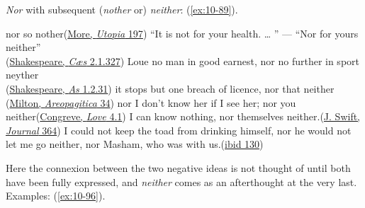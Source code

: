 \textit{Nor} with subsequent (\textit{nother} or) \textit{neither}: (\ref{ex:10-89}).

\ea \label{ex:10-89}
\ea
nor so nother\hfill(\href{https://archive.org/details/utopiasirthomas00robigoog/page/n307/mode/2up?q=%22nor+so+nother%22&view=theater}{More, \textit{Utopia} 197})
\ex
``It is not for your health. {\dots} '' --- ``Nor for yours neither''\\\hfill(\href{https://internetshakespeare.uvic.ca/doc/JC_F1/scene/2.1/index.html#tln-875}{Shakespeare, \textit{Cæs} 2.1.327})
\ex
Loue no man in good earnest, nor no further in sport neyther\\\hfill(\href{https://internetshakespeare.uvic.ca/doc/AYL_F1/scene/1.2/index.html#tln-195}{Shakespeare, \textit{As} 1.2.31})
\ex
it stops but one breach of licence, nor that neither\\ \hfill(\href{https://archive.org/details/areopagitica00miltuoft/page/34/mode/2up?q=%22it+stops+but+one%22&view=theater}{Milton, \textit{Areopagitica} 34})
\ex
nor I don't know her if I see her; nor you neither\hfill(\href{https://archive.org/details/in.ernet.dli.2015.219151/page/n207/mode/2up?q=%22know+her+if%22&view=theater}{Congreve, \textit{Love} 4.1}) %
\ex
I can know nothing, nor themselves neither.\hfill(\href{https://archive.org/details/journaltostellae00swifuoft/page/364/mode/2up?q=%22can+know+nothing%22&view=theater}{J. Swift, \textit{Journal} 364})
\ex
I could not keep the toad from drinking himself, nor he would not let me go neither, nor Masham, who was with us.\hfill(\href{https://archive.org/details/journaltostellae00swifuoft/page/130/mode/2up?q=%22toad+from+drinking%22&view=theater}{ibid 130})
\z
\z

Here the connexion between the two negative ideas is not thought of until both have been fully expressed, and \textit{neither} comes as an afterthought at the very last. Examples: (\ref{ex:10-96}).

